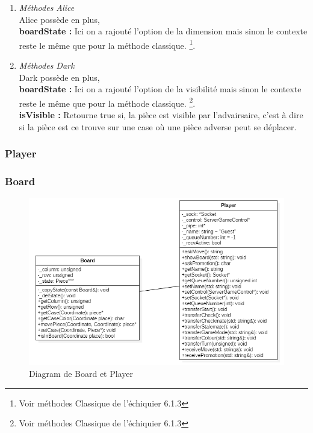 \documentclass[10pt, a4paper]{article}
\begin{document}
\begin{enumerate}
\item \textit{Méthodes Alice} \\
Alice possède en plus,\\
\textbf{boardState :} Ici on a rajouté l'option de la dimension mais sinon le contexte reste le même que pour la méthode classique. \footnote{Voir méthodes Classique de l'échiquier 6.1.3}. 

\item \textit{Méthodes Dark} \\
Dark possède en plus,\\
\textbf{boardState :} Ici on a rajouté l'option de la visibilité mais sinon le contexte reste le même que pour la méthode classique. \footnote{Voir méthodes Classique de l'échiquier 6.1.3}. \\
\textbf{isVisible :}  Retourne true si, la pièce est visible par l'advairsaire, c'est à dire si la pièce est ce trouve sur une case où une pièce adverse peut se déplacer.





\end{enumerate}
\subsubsection{Player}

\subsubsection{Board}
\begin{figure} [H]
\centering
\includegraphics[scale=0.50]{board_player_diagram.png}
\caption{Diagram de Board et Player}
\end{figure}
\end{document}
